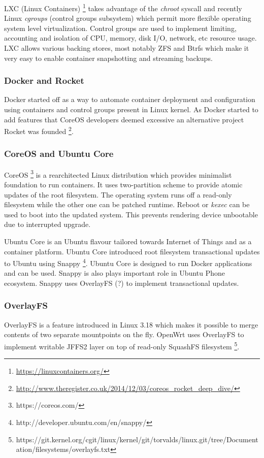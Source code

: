 \documentclass{article}
\begin{document}
LXC (Linux Containers) 
\footnote{\url{https://linuxcontainers.org/}}
takes advantage of the \emph{chroot} syscall and
recently Linux \emph{cgroups} (control groups subsystem) which permit
more flexible operating system level virtualization.
Control groups are used to implement limiting, accounting
and isolation of CPU, memory, disk I/O, network, etc resource usage.
LXC allows various backing stores, most notably ZFS and Btrfs
which make it very easy to enable container snapshotting
and streaming backups.

\subsubsection{Docker and Rocket}

Docker started off as a way to automate container deployment and
configuration using containers and control groups present in Linux
kernel. As Docker started to add features that CoreOS developers
deemed excessive an alternative project Rocket was founded
\footnote{\url{http://www.theregister.co.uk/2014/12/03/coreos_rocket_deep_dive/}}.

\subsubsection{CoreOS and Ubuntu Core}

CoreOS \footnote{https://coreos.com/} is a rearchitected Linux
distribution which provides minimalist foundation to run containers.
It uses two-partition scheme to provide atomic updates of the root
filesystem. The operating system runs off a read-only filesystem
while the other one can be patched runtime. Reboot or \emph{kexec}
can be used to boot into the updated system. This prevents rendering
device unbootable due to interrupted upgrade.

Ubuntu Core is an Ubuntu flavour tailored towards Internet of Things
and as a container platform. Ubuntu Core introduced root filesystem
transactional updates to Ubuntu using Snappy
\footnote{http://developer.ubuntu.com/en/snappy/}.
Ubuntu Core is designed to run Docker applications and can be used.
Snappy is also plays important role in Ubuntu Phone ecosystem.
Snappy uses OverlayFS (?) to implement transactional updates.


\subsubsection{OverlayFS}

OverlayFS is a feature introduced in Linux 3.18 which makes it
possible to merge contents of two separate mountpoints on the fly.
OpenWrt uses OverlayFS to implement writable JFFS2 layer on top of
read-only SquashFS filesystem
\footnote{https://git.kernel.org/cgit/linux/kernel/git/torvalds/linux.git/tree/Documentation/filesystems/overlayfs.txt}.
\end{document}
